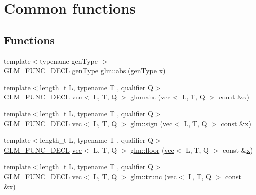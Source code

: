 \hypertarget{group__core__func__common}{}\section{Common functions}
\label{group__core__func__common}
\subsection*{Functions}
\begin{DoxyCompactItemize}
\item 
{\footnotesize template$<$typename gen\+Type $>$ }\\\hyperlink{setup_8hpp_ab2d052de21a70539923e9bcbf6e83a51}{G\+L\+M\+\_\+\+F\+U\+N\+C\+\_\+\+D\+E\+CL} gen\+Type \hyperlink{group__core__func__common_ga693d77696ff36572a0da79efec965acd}{glm\+::abs} (gen\+Type \hyperlink{_s_d_l__opengl_8h_ad0e63d0edcdbd3d79554076bf309fd47}{x})
\item 
{\footnotesize template$<$length\+\_\+t L, typename T , qualifier Q$>$ }\\\hyperlink{setup_8hpp_ab2d052de21a70539923e9bcbf6e83a51}{G\+L\+M\+\_\+\+F\+U\+N\+C\+\_\+\+D\+E\+CL} \hyperlink{structglm_1_1vec}{vec}$<$ L, T, Q $>$ \hyperlink{group__core__func__common_ga3e141c9738c73d3e581efa471dba8b4c}{glm\+::abs} (\hyperlink{structglm_1_1vec}{vec}$<$ L, T, Q $>$ const \&\hyperlink{_s_d_l__opengl_8h_ad0e63d0edcdbd3d79554076bf309fd47}{x})
\item 
{\footnotesize template$<$length\+\_\+t L, typename T , qualifier Q$>$ }\\\hyperlink{setup_8hpp_ab2d052de21a70539923e9bcbf6e83a51}{G\+L\+M\+\_\+\+F\+U\+N\+C\+\_\+\+D\+E\+CL} \hyperlink{structglm_1_1vec}{vec}$<$ L, T, Q $>$ \hyperlink{group__core__func__common_ga1e2e5cfff800056540e32f6c9b604b28}{glm\+::sign} (\hyperlink{structglm_1_1vec}{vec}$<$ L, T, Q $>$ const \&\hyperlink{_s_d_l__opengl_8h_ad0e63d0edcdbd3d79554076bf309fd47}{x})
\item 
{\footnotesize template$<$length\+\_\+t L, typename T , qualifier Q$>$ }\\\hyperlink{setup_8hpp_ab2d052de21a70539923e9bcbf6e83a51}{G\+L\+M\+\_\+\+F\+U\+N\+C\+\_\+\+D\+E\+CL} \hyperlink{structglm_1_1vec}{vec}$<$ L, T, Q $>$ \hyperlink{group__core__func__common_gaa9d0742639e85b29c7c5de11cfd6840d}{glm\+::floor} (\hyperlink{structglm_1_1vec}{vec}$<$ L, T, Q $>$ const \&\hyperlink{_s_d_l__opengl_8h_ad0e63d0edcdbd3d79554076bf309fd47}{x})
\item 
{\footnotesize template$<$length\+\_\+t L, typename T , qualifier Q$>$ }\\\hyperlink{setup_8hpp_ab2d052de21a70539923e9bcbf6e83a51}{G\+L\+M\+\_\+\+F\+U\+N\+C\+\_\+\+D\+E\+CL} \hyperlink{structglm_1_1vec}{vec}$<$ L, T, Q $>$ \hyperlink{group__core__func__common_gaf9375e3e06173271d49e6ffa3a334259}{glm\+::trunc} (\hyperlink{structglm_1_1vec}{vec}$<$ L, T, Q $>$ const \&\hyperlink{_s_d_l__opengl_8h_ad0e63d0edcdbd3d79554076bf309fd47}{x})

\end{DoxyCompactItemize}
